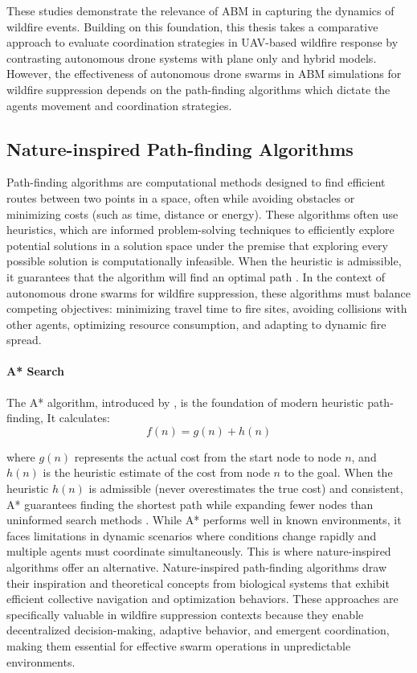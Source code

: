 \documentclass[twoside]{article}
\begin{document}
These studies demonstrate the relevance of ABM in capturing the dynamics of wildfire events. Building on this foundation, this thesis takes a comparative approach to evaluate coordination strategies in UAV-based wildfire response by contrasting autonomous drone systems with plane only and hybrid models. However, the effectiveness of autonomous drone swarms in ABM simulations for wildfire suppression depends on the path-finding algorithms which dictate the agents movement and coordination strategies.

\subsection{Nature-inspired Path-finding Algorithms}

Path-finding algorithms are computational methods designed to find efficient routes between two points in a space, often while avoiding obstacles or minimizing costs (such as time, distance or energy). These algorithms often use heuristics, which are informed problem-solving techniques to efficiently explore potential solutions in a solution space under the premise that exploring every possible solution is computationally infeasible. When the heuristic is admissible, it guarantees that the algorithm will find an optimal path \citep{heuristic}.
In the context of autonomous drone swarms for wildfire suppression, these algorithms must balance competing objectives: minimizing travel time to fire sites, avoiding collisions with other agents, optimizing resource consumption, and adapting to dynamic fire spread.

\paragraph{A* Search} The A* algorithm, introduced by \citet*{heuristic}, is the foundation of modern heuristic path-finding, It calculates:
\begin{equation}
  f(n) = g(n) + h(n)
\end{equation}

where $g(n)$ represents the actual cost from the start node to node $n$, and $h(n)$ is the heuristic estimate of the cost from node $n$ to the goal. When the heuristic $h(n)$ is admissible (never overestimates the true cost) and consistent, A* guarantees finding the shortest path while expanding fewer nodes than uninformed search methods \citep{heuristic}. 
While A* performs well in known environments, it faces limitations in dynamic scenarios where conditions change rapidly and multiple agents must coordinate simultaneously. This is where nature-inspired algorithms offer an alternative.
Nature-inspired path-finding algorithms draw their inspiration and theoretical concepts from biological systems that exhibit efficient collective navigation and optimization behaviors. These approaches are specifically valuable in wildfire suppression contexts because they enable decentralized decision-making, adaptive behavior, and emergent coordination, making them essential for effective swarm operations in unpredictable environments.
\end{document}
